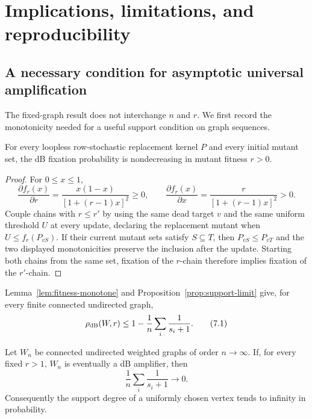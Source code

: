 \section{Implications, limitations, and reproducibility}

\subsection{A necessary condition for asymptotic universal amplification}

The fixed-graph result does not interchange $n$ and $r$.  We first record the
monotonicity needed for a useful support condition on graph sequences.

\begin{lemma}\label{lem:fitness-monotone}
For every loopless row-stochastic replacement kernel $P$ and every initial
mutant set, the dB fixation probability is nondecreasing in mutant fitness
$r>0$.
\end{lemma}

\begin{proof}
For $0\le x\le1$,
\[
 \frac{\partial f_r(x)}{\partial r}
 =\frac{x(1-x)}{[1+(r-1)x]^2}\ge0,
 \qquad
 \frac{\partial f_r(x)}{\partial x}
 =\frac{r}{[1+(r-1)x]^2}>0.
\]
Couple chains with $r\le r'$ by using the same dead target $v$ and the same
uniform threshold $U$ at every update, declaring the replacement mutant when
$U\le f_r(P_{vS})$.  If their current mutant sets satisfy $S\subseteq T$,
then $P_{vS}\le P_{vT}$ and the two displayed monotonicities preserve the
inclusion after the update.  Starting both chains from the same set, fixation
of the $r$-chain therefore implies fixation of the $r'$-chain.
\end{proof}

Lemma~\ref{lem:fitness-monotone} and
Proposition~\ref{prop:support-limit} give, for every finite connected
undirected graph,
\[
 \rho_{\mathrm{dB}}(W,r)\le1-\frac1n\sum_i\frac1{s_i+1}.              \tag{7.1}\label{7.1}
\]

\begin{proposition}\label{prop:degree}
Let $W_n$ be connected undirected weighted graphs of order $n\to\infty$.
If, for every fixed $r>1$, $W_n$ is eventually a dB amplifier, then
\[
 \frac1n\sum_i\frac1{s_i+1}\longrightarrow0.                \tag{7.2}\label{7.2}
\]
Consequently the support degree of a uniformly chosen vertex tends to
infinity in probability.
\end{proposition}

